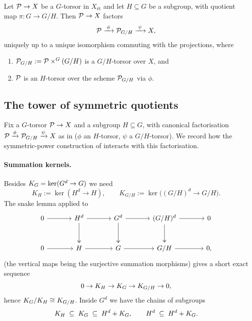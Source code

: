 \documentclass[11pt]{article}
\begin{document}
\begin{prop}\label{prop:quotient_torsors_finite}\label{prop:quotient_torsors}
Let $\mathcal{P} \to X$ be a $G$-torsor in $X_{\text{\'et}}$ and let $H \subseteq G$ be
a subgroup, with quotient map $\pi : G \to G/H$.  Then $\mathcal{P} \to X$ factors
\[
\mathcal{P} \xrightarrow{\;\phi\;} \mathcal{P}_{G/H} \xrightarrow{\;\psi\;} X,
\]
uniquely up to a unique isomorphism commuting with the projections, where
\begin{enumerate}
    \item $\mathcal{P}_{G/H} := \mathcal{P} \times^G (G/H)$ is a $G/H$-torsor over $X$, and
    \item $\mathcal{P}$ is an $H$-torsor over the scheme $\mathcal{P}_{G/H}$ via $\phi$.
\end{enumerate}
\end{prop}

\subsection{The tower of symmetric quotients}\label{subsection:quotient_torsors_towers}

Fix a $G$-torsor $\mathcal{P} \to X$ and a subgroup $H \subseteq G$, with canonical
factorisation $\mathcal{P} \xrightarrow{\phi} \mathcal{P}_{G/H} \xrightarrow{\psi} X$ as in
 ($\phi$ an $H$-torsor, $\psi$ a
$G/H$-torsor).  We record how the symmetric-power construction of
 interacts with this factorisation.

\paragraph{Summation kernels.}
Besides $K_{G} = \ker(G^d \to G)$ we need
\[
K_H := \ker(H^d \to H), \qquad K_{G/H} := \ker\bigl((G/H)^d \to G/H\bigr).
\]
The snake lemma applied to
\[
\begin{tikzcd}[row sep=large, column sep=large]
0 \arrow[r] & H^d \arrow[r] \arrow[d, twoheadrightarrow] & G^d \arrow[r] \arrow[d, twoheadrightarrow] & (G/H)^d \arrow[r] \arrow[d, twoheadrightarrow] & 0 \\
0 \arrow[r] & H \arrow[r] & G \arrow[r] & G/H \arrow[r] & 0,
\end{tikzcd}
\]
(the vertical maps being the surjective summation morphisms) gives a short exact
sequence
\begin{equation}\label{eq:summation_kernels_ses}
0 \to K_H \to K_{G} \to K_{G/H} \to 0,
\end{equation}
hence $K_{G}/K_H \cong K_{G/H}$.  Inside $G^d$ we have the chains of subgroups
\[
K_H \;\subseteq\; K_{G} \;\subseteq\; H^d + K_{G}, \qquad H^d \;\subseteq\; H^d + K_{G} .
\]
\end{document}

